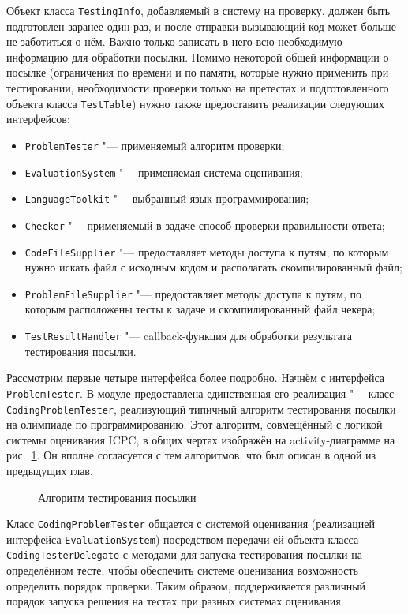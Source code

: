 Объект класса \texttt{Testing\-Info}, добавляемый в систему на проверку, должен быть подготовлен заранее один раз, и после отправки вызывающий код может больше не заботиться о нём. Важно только записать в него всю необходимую информацию для обработки посылки. Помимо некоторой общей информации о посылке (ограничения по времени и по памяти, которые нужно применить при тестировании, необходимости проверки только на претестах и подготовленного объекта класса \texttt{Test\-Table}) нужно также предоставить реализации следующих интерфейсов:

\begin{itemize}
\item \texttt{ProblemTester} "--- применяемый алгоритм проверки;
\item \texttt{EvaluationSystem} "--- применяемая система оценивания;
\item \texttt{LanguageToolkit} "--- выбранный язык программирования;
\item \texttt{Checker} "--- применяемый в задаче способ проверки правильности ответа;
\item \texttt{CodeFileSupplier} "--- предоставляет методы доступа к путям, по которым нужно искать файл с исходным кодом и располагать скомпилированный файл;
\item \texttt{ProblemFileSupplier} "--- предоставляет методы доступа к путям, по которым расположены тесты к задаче и скомпилированный файл чекера;
\item \texttt{TestResultHandler} "--- callback-функция для обработки результата тестирования посылки.
\end{itemize}

Рассмотрим первые четыре интерфейса более подробно. Начнём с интерфейса \texttt{Problem\-Tester}. В модуле предоставлена единственная его реализация "--- класс \texttt{Coding\-Problem\-Tester}, реализующий типичный алгоритм тестирования посылки на олимпиаде по программированию. Этот алгоритм, совмещённый с логикой системы оценивания ICPC, в общих чертах изображён на activity-диаграмме на рис.~\ref{activity_diagram_testing}. Он вполне согласуется с тем алгоритмов, что был описан в одной из предыдущих глав.

\begin{figure}[h]
\caption{Алгоритм тестирования посылки}
\label{activity_diagram_testing}
\end{figure}

Класс \texttt{Coding\-Problem\-Tester} общается с системой оценивания (реализацией интерфейса \texttt{Evaluation\-System}) посредством передачи ей объекта класса \texttt{Coding\-Tester\-Delegate} с методами для запуска тестирования посылки на определённом тесте, чтобы обеспечить системе оценивания возможность определить порядок проверки. Таким образом, поддерживается различный порядок запуска решения на тестах при разных системах оценивания.

